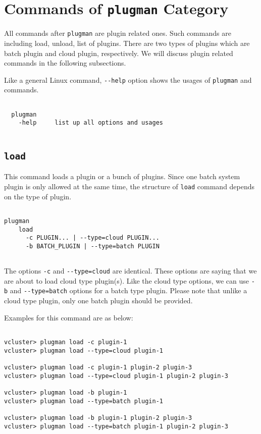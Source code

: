 \documentclass[11pt]{article}
\def \ttt{\texttt}
\def \vb{\verb}
\begin{document}
\newpage

\section{Commands of \ttt{plugman} Category}

All commands after \vb+plugman+ are plugin related ones. Such commands are including load, unload, list of plugins. There are two types of plugins which are batch plugin and cloud plugin, respectively. We will discuss plugin related commands in the following subsections.

Like a general Linux command, \vb+--help+ option shows the usages of \vb+plugman+ and commands.

\begin{Verbatim}[fontfamily=courier, fontsize = \small, obeytabs
=true, tabsize=4, frame=lines]

  plugman 
    -help     list up all options and usages
  
\end{Verbatim}


\subsection{\ttt{load}}
This command loads a plugin or a bunch of plugins. Since one batch system plugin is only allowed at the same time, the structure of \vb+load+ command depends on the type of plugin.  

\begin{Verbatim}[fontfamily=courier, fontsize = \small, obeytabs
=true, tabsize=4, frame=lines]

plugman 
    load
      -c PLUGIN... | --type=cloud PLUGIN... 
      -b BATCH_PLUGIN | --type=batch PLUGIN
      
\end{Verbatim}


The options \vb+-c+ and \vb+--type=cloud+ are identical. These options are saying that we are about to load cloud type plugin(s). Like the cloud type options, we can use \vb+-b+ and \vb+--type=batch+ options for a batch type plugin. Please note that unlike a cloud type plugin, only one batch plugin should be provided.

Examples for this command are as below:


\begin{Verbatim}[fontfamily=courier, fontsize = \small, obeytabs
=true, tabsize=4, frame=lines]

vcluster> plugman load -c plugin-1
vcluster> plugman load --type=cloud plugin-1

vcluster> plugman load -c plugin-1 plugin-2 plugin-3
vcluster> plugman load --type=cloud plugin-1 plugin-2 plugin-3

vcluster> plugman load -b plugin-1
vcluster> plugman load --type=batch plugin-1

vcluster> plugman load -b plugin-1 plugin-2 plugin-3
vcluster> plugman load --type=batch plugin-1 plugin-2 plugin-3

\end{Verbatim}
\end{document}
